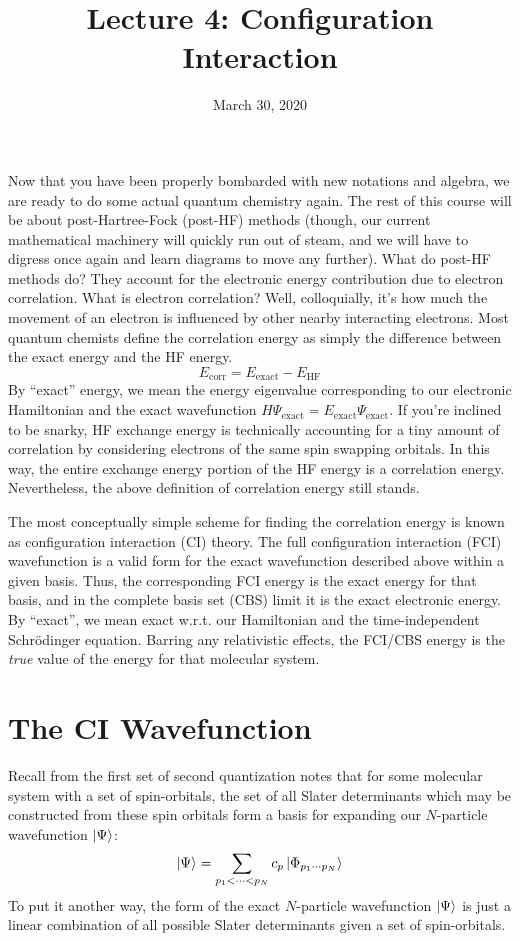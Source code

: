 \documentclass{article}
\title{Lecture 4: Configuration Interaction}
\date{March 30, 2020}
\begin{document}
\maketitle
\noindent
Now that you have been properly bombarded with new notations and algebra, we are ready to do some actual quantum chemistry again. 
The rest of this course will be about post-Hartree-Fock (post-HF) methods (though, our current mathematical machinery will quickly run out of steam, 
    and we will have to digress once again and learn diagrams to move any further).  
What do post-HF methods do? They account for the electronic energy contribution due to electron correlation. 
What is electron correlation? Well, colloquially, it's how much the movement of an electron is influenced by other nearby interacting electrons. 
Most quantum chemists define the correlation energy as simply the difference between the exact energy and the HF energy. 
\[E_{\mathrm{corr}}  = E_{\mathrm{exact}} - E_{\mathrm{HF}} \]
By ``exact'' energy, we mean the energy eigenvalue corresponding to our electronic Hamiltonian and the 
    exact wavefunction $\hat{H} \Psi_{\mathrm{exact}} = E_{\mathrm{exact}}  \Psi_{\mathrm{exact}} $. 
If you're inclined to be snarky, HF exchange energy is technically accounting 
    for a tiny amount of correlation by considering electrons of the same spin swapping orbitals. 
In this way, the entire exchange energy portion of the HF energy is a correlation energy. 
Nevertheless, the above definition of correlation energy still stands.

The most conceptually simple scheme for finding the correlation energy is known as configuration interaction (CI) theory.
The full configuration interaction (FCI) wavefunction is a valid form for the exact wavefunction described above within a given basis.
Thus, the corresponding FCI energy is the exact energy for that basis, and in the complete basis set (CBS) limit it is the exact electronic energy.
By ``exact'', we mean exact w.r.t. our Hamiltonian and the time-independent Schr{\"o}dinger equation.
Barring any relativistic effects, the FCI/CBS energy is the \textit{true} value of the energy for that molecular system.

\section{The CI Wavefunction} 
Recall from the first set of second quantization notes that for some molecular system with a set of spin-orbitals,
the set of all Slater determinants which may be constructed from these spin orbitals form a basis for expanding our $N$-particle wavefunction $\ket{\Psi}$:
\[ \ket{\Psi} = \sum_{p_1 < \cdots < p_N} c_p \ket{\Phi_{p_1 \cdots p_N}} \]
To put it another way, the form of the exact $N$-particle wavefunction $\ket{\Psi}$ is just a linear combination of all possible Slater determinants given a set of spin-orbitals.
\end{document}
